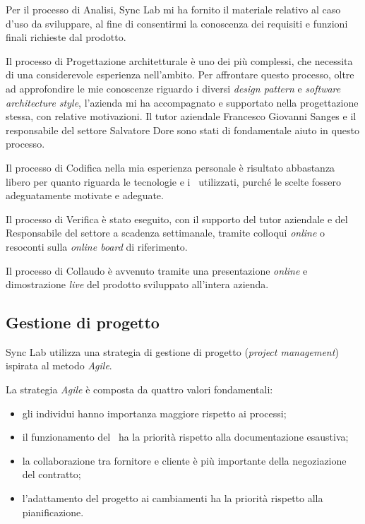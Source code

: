 Per il processo di Analisi, Sync Lab mi ha fornito il materiale relativo al caso d'uso da sviluppare, al fine di consentirmi la conoscenza dei requisiti e funzioni finali richieste dal prodotto.

Il processo di Progettazione architetturale è uno dei più complessi, che necessita di una considerevole esperienza nell'ambito.
Per affrontare questo processo, oltre ad approfondire le mie conoscenze riguardo i diversi \textit{design pattern} e \textit{software architecture style}, l'azienda mi ha accompagnato e supportato nella progettazione stessa, con relative motivazioni.
Il tutor aziendale  Francesco Giovanni Sanges e il responsabile del settore  Salvatore Dore
sono stati di fondamentale aiuto in questo processo.

Il processo di Codifica nella mia esperienza personale è risultato abbastanza libero per quanto riguarda le tecnologie e i \software\ utilizzati, purché le scelte fossero adeguatamente motivate e adeguate.

Il processo di Verifica è stato eseguito, con il supporto del tutor aziendale e del Responsabile del settore  a scadenza settimanale, tramite colloqui \textit{online} o resoconti sulla \textit{online board} di riferimento.

Il processo di Collaudo è avvenuto tramite una presentazione \textit{online} e dimostrazione \textit{live} del prodotto sviluppato all'intera azienda.

\subsection{Gestione di progetto}


Sync Lab utilizza una strategia di gestione di progetto (\textit{project management}) ispirata al metodo \textit{Agile}.

\noindent
La strategia \textit{Agile} è composta da quattro valori fondamentali:
\begin{itemize}
  \item gli individui hanno importanza maggiore rispetto ai processi;
  \item il funzionamento del \software\ ha la priorità rispetto alla documentazione esaustiva;
  \item la collaborazione tra fornitore e cliente è più importante della negoziazione del contratto;
  \item l'adattamento del progetto ai cambiamenti ha la priorità rispetto alla pianificazione.
\end{itemize}

